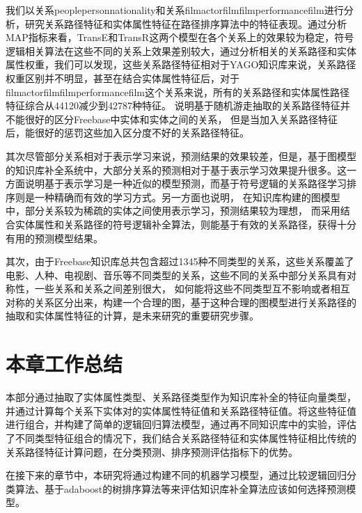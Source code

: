 我们以关系peoplepersonnationality和关系filmactorfilmfilmperformancefilm进行分析，研究关系路径特征和实体属性特征在路径排序算法中的特征表现。通过分析MAP指标来看，TransE和TransR这两个模型在各个关系上的效果较为稳定，符号逻辑相关算法在这些不同的关系上效果差别较大，通过分析相关的关系路径和实体属性权重，我们可以发现，这些关系路径特征相对于YAGO知识库来说，关系路径权重区别并不明显，甚至在结合实体属性特征后，对于filmactorfilmfilmperformancefilm这个关系来说，所有的关系路径和实体属性路径特征综合从44120减少到42787种特征。
说明基于随机游走抽取的关系路径特征并不能很好的区分Freebase中实体和实体之间的关系，
但是当加入关系路径特征后，能很好的惩罚这些加入区分度不好的关系路径特征。

其次尽管部分关系相对于表示学习来说，预测结果的效果较差，但是，基于图模型的知识库补全系统中，大部分关系的预测相对于基于表示学习效果提升很多。这一方面说明基于表示学习是一种近似的模型预测，而基于符号逻辑的关系路径学习排序则是一种精确而有效的学习方式。另一方面也说明，
在知识库构建的图模型中，部分关系较为稀疏的实体之间使用表示学习，预测结果较为理想，
而采用结合实体属性和关系路径的符号逻辑补全算法，则能基于有效的关系路径，获得十分有用的预测模型结果。

其次，由于Freebase知识库总共包含超过1345种不同类型的关系，这些关系覆盖了电影、人种、电视剧、音乐等不同类型的关系，这些不同的关系中部分关系具有对称性，一些关系和关系之间差别很大，
如何能将这些不同类型互不影响或者相互对称的关系区分出来，构建一个合理的图，基于这种合理的图模型进行关系路径的抽取和实体属性特征的计算，是未来研究的重要研究步骤。

\section{本章工作总结}
本部分通过抽取了实体属性类型、关系路径类型作为知识库补全的特征向量类型，并通过计算每个关系下实体对的实体属性特征值和关系路径特征值。将这些特征值进行组合，并构建了简单的逻辑回归算法模型，通过再不同知识库中的实验，评估了不同类型特征组合的情况下，我们结合关系路径特征和实体属性特征相比传统的关系路径特征计算问题，在分类预测、排序预测评估指标下的优势。

在接下来的章节中，本研究将通过构建不同的机器学习模型，通过比较逻辑回归分类算法、基于adaboost的树排序算法等来评估知识库补全算法应该如何选择预测模型。 